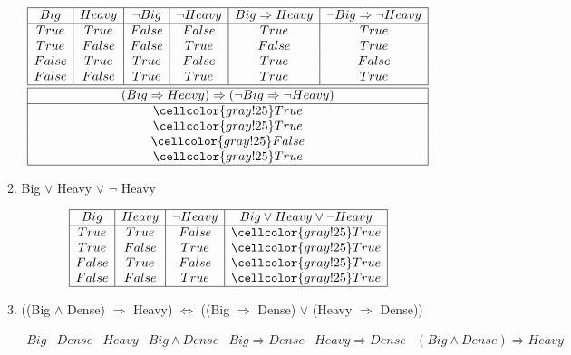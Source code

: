 \documentclass[10pt]{article}
\begin{document}
\begin{enumerate}
\begin{enumerate}
\begin{displaymath}
\begin{array} {|c|c|c|c|c|c|}
  	  \hline
      Big & Heavy & \neg Big & \neg Heavy & Big \Rightarrow Heavy & \neg Big \Rightarrow \neg Heavy \\
      \hline
      True & True & False & False & True & True \\
      True & False & False & True & False & True  \\
      False & True & True & False & True & False \\
      False & False & True & True & True & True \\
      \hline\hline
      \multicolumn{6}{|c|}{(Big \Rightarrow Heavy) \Rightarrow (\neg Big \Rightarrow \neg Heavy)}\\
      \hline
      \multicolumn{6}{|c|}{\cellcolor{gray!25}True} \\
      \multicolumn{6}{|c|}{\cellcolor{gray!25}True} \\
      \multicolumn{6}{|c|}{\cellcolor{gray!25}False} \\
      \multicolumn{6}{|c|}{\cellcolor{gray!25}True} \\
      \hline
    \end{array}
  \end{displaymath}
  \item Big $\vee$ Heavy $\vee$ $\neg$ Heavy \par
  \begin{displaymath}
    \begin{array} {|c|c|c|c|}
  	  \hline
      Big & Heavy & \neg Heavy & Big \vee Heavy \vee \neg Heavy \\
      \hline
      True & True & False & \cellcolor{gray!25}True \\
      True & False & True & \cellcolor{gray!25}True \\
      False & True & False & \cellcolor{gray!25}True \\
      False & False & True & \cellcolor{gray!25}True \\
      \hline
    \end{array}
  \end{displaymath}
  \newpage
  \item ((Big $\wedge$ Dense) $\Rightarrow$ Heavy) $\Leftrightarrow$ ((Big $\Rightarrow$ Dense) $\vee$ (Heavy $\Rightarrow$ Dense)) \par
  \begin{displaymath}
    \begin{array} {|c|c|c|c|c|c|c|c|}
  	  \hline
      Big & Dense & Heavy & Big \wedge Dense & Big \Rightarrow Dense & Heavy \Rightarrow Dense & (Big \wedge Dense) \Rightarrow Heavy \\

\end{array}
\end{displaymath}
\end{enumerate}
\end{enumerate}
\end{document}
